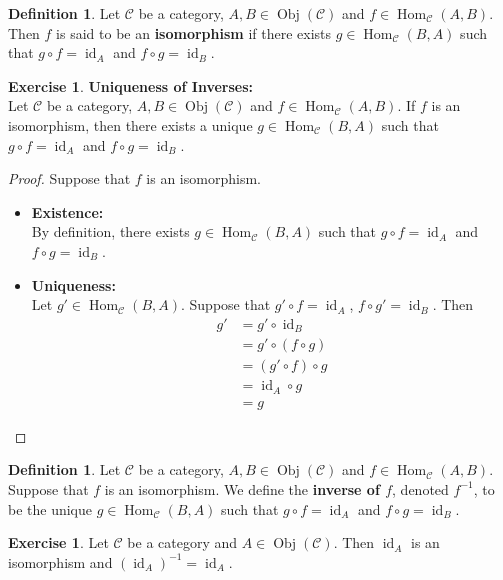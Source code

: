\documentclass{book}
\theoremstyle{definition}
\newtheorem{defn}[definition]{Definition}
\newtheorem{ex}[definition]{Exercise}
\newcommand{\MC}{\mathcal{C}}
\newcommand{\lex}[1]{\label{ex:#1}}
\newcommand{\ld}[1]{\label{defn:#1}}
\DeclareMathOperator{\id}{id}
\DeclareMathOperator{\Obj}{Obj}
\DeclareMathOperator{\Hom}{Hom}
\DeclareMathOperator*{\0}{\mbf{0}}
\DeclareMathOperator*{\1}{\mbf{1}}
\newcommand{\tbf}[1]{\textbf{#1}}
\begin{document}
	\begin{defn} \ld{15002}
		Let $\MC$ be a category, $A,B \in \Obj(\MC)$ and $f \in \Hom_{\MC}(A, B)$. Then $f$ is said to be an \textbf{isomorphism} if there exists $g \in \Hom_{\MC}(B, A)$ such that $g \circ f = \id_{A}$ and $f \circ g = \id_{B}$. 
	\end{defn}
	
	\begin{ex} \lex{15003} \textbf{Uniqueness of Inverses:} \\
		Let $\MC$ be a category, $A,B \in \Obj(\MC)$ and $f \in \Hom_{\MC}(A, B)$. If $f$ is an isomorphism, then there exists a unique $g \in \Hom_{\MC}(B, A)$ such that $g \circ f = \id_A$ and $f \circ g = \id_B$.
	\end{ex}
	
	\begin{proof}
		Suppose that $f$ is an isomorphism. 
		\begin{itemize}
			\item \tbf{Existence:} \\
			By definition, there exists $g \in \Hom_{\MC}(B, A)$ such that $g \circ f = \id_{A}$ and $f \circ g = \id_B$.
			\item \tbf{Uniqueness: } \\
			Let $g' \in \Hom_{\MC}(B, A)$. Suppose that $g' \circ f = \id_A$, $f \circ g' = \id_B$. Then 
			\begin{align*}
				g'
				& = g' \circ \id_{B} \\
				& = g' \circ (f \circ g) \\
				& = (g' \circ f) \circ  g \\
				& = \id_A \circ g \\
				& = g
			\end{align*}
		\end{itemize}
	\end{proof}

	\begin{defn} \ld{15003.1}
		Let $\MC$ be a category, $A,B \in \Obj(\MC)$ and $f \in \Hom_{\MC}(A, B)$. Suppose that $f$ is an isomorphism. We define the \textbf{inverse of $f$}, denoted $f^{-1}$, to be the unique $g \in \Hom_{\MC}(B, A)$ such that $g \circ f = \id_A$ and $f \circ g = \id_B$.
	\end{defn}
	
	\begin{ex} \lex{15004}
		Let $\MC$ be a category and $A \in \Obj(\MC)$. Then $\id_A$ is an isomorphism and $(\id_A)^{-1} = \id_A$. 
	\end{ex}
	
\end{document}
